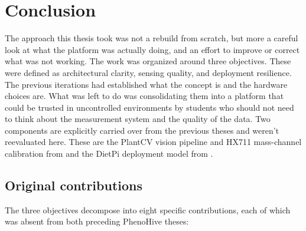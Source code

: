 ﻿\chapter{Conclusion}
\label{ch:conclusion}

\begingroup
\setlength{\parskip}{0.6em}

The approach this thesis took was not a rebuild from scratch, but more a careful look at what the platform was actually doing, and an effort to improve or correct what was not working. The work was organized around three objectives. These were defined as architectural clarity, sensing quality, and deployment resilience. The previous iterations had established what the concept is and the hardware choices are. What was left to do was consolidating them into a platform that could be trusted in uncontrolled environments by students who should not need to think about the measurement system and the quality of the data. Two components are explicitly carried over from the previous theses and weren't reevaluated here. These are the PlantCV vision pipeline and HX711 mass-channel calibration from \textcite{colinet2025} and the DietPi deployment model from \textcite{goffinet2024}.

\section*{Original contributions}

The three objectives decompose into eight specific contributions, each of which was absent from both preceding PhenoHive theses:


